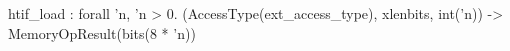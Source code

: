 htif_load : forall 'n, 'n > 0. (AccessType(ext_access_type), xlenbits, int('n)) -> MemoryOpResult(bits(8 * 'n))